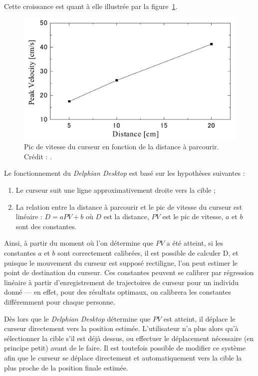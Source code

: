 	Cette croissance est quant à elle illustrée par la figure~\ref{fig:delphianSpeedDist}.
	
	\begin{figure}[H]
		\centering
		\includegraphics[width=\textwidth]{figures/ch2/delphianSpeedDist}
		\caption[Pic de vitesse du curseur en fonction de la distance à parcourir]{Pic de vitesse du curseur en fonction de la distance à parcourir. Crédit : \cite{asano2005predictive}.}
		\label{fig:delphianSpeedDist}
	\end{figure}
	
	Le fonctionnement du \emph{Delphian Desktop} est basé sur les hypothèses suivantes :
	
	\begin{enumerate}
		\item Le curseur suit une ligne approximativement droite vers la cible ;
		\item La relation entre la distance à parcourir et le pic de vitesse du curseur est linéaire : $D = aPV + b$ où $D$ est la distance, $PV$ est le pic de vitesse, $a$ et $b$ sont des constantes.
	\end{enumerate}
	
	Ainsi, à partir du moment où l'on détermine que $PV$ a été atteint, si les constantes $a$ et $b$ sont correctement calibrées, il est possible de calculer D, et puisque le mouvement du curseur est supposé rectiligne, l'on peut estimer le point de destination du curseur. Ces constantes peuvent se calibrer par régression linéaire à partir d'enregistrement de trajectoires de curseur pour un individu donné --- en effet, pour des résultats optimaux, on calibrera les constantes différemment pour chaque personne.
	
	Dès lors que le \emph{Delphian Desktop} détermine que $PV$ est atteint, il déplace le curseur directement vers la position estimée. L'utilisateur n'a plus alors qu'à sélectionner la cible s'il est déjà dessus, ou effectuer le déplacement nécessaire (en principe petit) avant de le faire. Il est toutefois possible de modifier ce système afin que le curseur se déplace directement et automatiquement vers la cible la plus proche de la position finale estimée.
	

